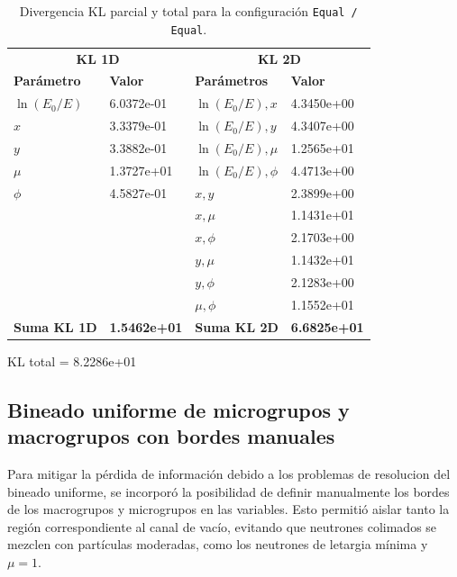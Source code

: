 \begin{table}[H]
    \centering
    \caption{Divergencia KL parcial y total para la configuración \texttt{Equal / Equal}.}
    \label{tab:KL_parciales_equal_columns}
    \begin{tabular}{ll@{\hspace{2cm}}ll}
    \toprule
    \multicolumn{2}{c}{\textbf{KL 1D}} & \multicolumn{2}{c}{\textbf{KL 2D}} \\
    \cmidrule(lr){1-2} \cmidrule(lr){3-4}
    \textbf{Parámetro} & \textbf{Valor} & \textbf{Parámetros} & \textbf{Valor} \\
    \midrule
    $\ln(E_0/E)$ & 6.0372e-01 & $\ln(E_0/E), x$ & 4.3450e+00 \\
    $x$ & 3.3379e-01 & $\ln(E_0/E), y$ & 4.3407e+00 \\
    $y$ & 3.3882e-01 & $\ln(E_0/E), \mu$ & 1.2565e+01 \\
    $\mu$ & 1.3727e+01 & $\ln(E_0/E), \phi$ & 4.4713e+00 \\
    $\phi$ & 4.5827e-01 & $x, y$ & 2.3899e+00 \\
    & & $x, \mu$ & 1.1431e+01 \\
    & & $x, \phi$ & 2.1703e+00 \\
    & & $y, \mu$ & 1.1432e+01 \\
    & & $y, \phi$ & 2.1283e+00 \\
    & & $\mu, \phi$ & 1.1552e+01 \\
    \midrule
    \textbf{Suma KL 1D} & \textbf{1.5462e+01} & \textbf{Suma KL 2D} & \textbf{6.6825e+01} \\
    \bottomrule
    \end{tabular}
    \vspace{0.5em}
    
    KL total = 8.2286e+01
\end{table}

\subsection{Bineado uniforme de microgrupos y macrogrupos con bordes manuales}

Para mitigar la pérdida de información debido a los problemas de resolucion del bineado uniforme, se incorporó la posibilidad de definir manualmente los bordes de los macrogrupos y microgrupos en las variables. Esto permitió aislar tanto la región correspondiente al canal de vacío, evitando que neutrones colimados se mezclen con partículas moderadas, como los neutrones de letargia mínima y $\mu = 1$.


